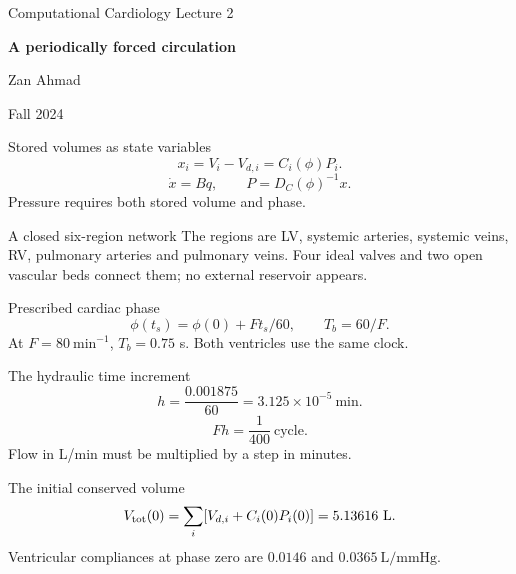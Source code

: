 \documentclass[aspectratio=169,11pt]{beamer}
\newcommand{\notestarget}{notes.pdf}\newcommand{\noteslabel}{Notes}
\begin{document}
\begin{frame}[plain]\vfill
{\small\color{accent} Computational Cardiology \quad Lecture 2}\par\medskip
{\raggedright{}\LARGE\bfseries\color{ink} A periodically forced circulation}\par\bigskip
Zan Ahmad\par\smallskip
{\small Fall 2024}\par\vfill\end{frame}
\renewcommand{\notestarget}{notes.pdf\#note-pressure-volume-coordinates-and-cardiac-phase}
\begin{frame}[t,fragile,label=slide-stored-volumes-as-state-variables]{Stored volumes as state variables}
\[x_i=V_i-V_{d,i}=C_i(\phi)P_i.\]\pause{}\[\dot x=Bq,\qquad P=D_C(\phi)^{-1}x.\] Pressure requires both stored volume and phase.
\end{frame}
\renewcommand{\notestarget}{notes.pdf\#note-the-six-region-initial-value-problem}
\begin{frame}[t,fragile,label=slide-a-closed-six-region-network]{A closed six-region network}
The regions are LV, systemic arteries, systemic veins, RV, pulmonary arteries and pulmonary veins.\pause{} Four ideal valves and two open vascular beds connect them; no external reservoir appears.
\end{frame}
\renewcommand{\notestarget}{notes.pdf\#note-pressure-volume-coordinates-and-cardiac-phase}
\begin{frame}[t,fragile,label=slide-prescribed-cardiac-phase]{Prescribed cardiac phase}
\[\phi(t_s)=\phi(0)+Ft_s/60,\qquad T_b=60/F.\]\pause{} At $F=80\ \mathrm{min}^{-1}$, $T_b=0.75$ s. Both ventricles use the same clock.
\end{frame}
\renewcommand{\notestarget}{notes.pdf\#note-pressure-volume-coordinates-and-cardiac-phase}
\begin{frame}[t,fragile,label=slide-the-hydraulic-time-increment]{The hydraulic time increment}
\[h=\frac{0.001875}{60}=3.125\times10^{-5}\ \mathrm{min}.\]\pause{}\[Fh=\frac1{400}\ \text{cycle}.\] Flow in L/min must be multiplied by a step in minutes.
\end{frame}
\renewcommand{\notestarget}{notes.pdf\#note-pressure-volume-coordinates-and-cardiac-phase}
\begin{frame}[t,fragile,label=slide-the-initial-conserved-volume]{The initial conserved volume}
\[V_{\rm tot}(0)=\sum_i[V_{d,i}+C_i(0)P_i(0)]=5.13616\ \mathrm L.\]\pause{} Ventricular compliances at phase zero are $0.0146$ and $0.0365\ \mathrm{L/mmHg}$.
\end{frame}
\end{document}
